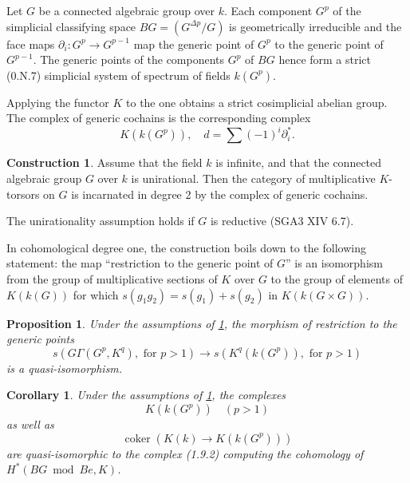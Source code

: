 \documentclass[11pt,a4paper]{article}
\theoremstyle{plain}
\newtheorem{proposition}[theorem]{Proposition}
\newtheorem{corollary}[theorem]{Corollary}
\theoremstyle{definition}
\newtheorem{construction}[theorem]{Construction}
\DeclareMathOperator{\coker}{coker}
\begin{document}
Let $G$ be a connected algebraic group over $k$. Each component $G^p$ of the simplicial classifying space $BG = (G^{\Delta p}/G)$ is geometrically irreducible and the face maps $\partial_i: G^p \to G^{p-1}$ map the generic point of $G^p$ to the generic point of $G^{p-1}$. The generic points of the components $G^p$ of $BG$ hence form a strict (0.N.7) simplicial system of spectrum of fields $k(G^p)$.

Applying the functor $K$ to the one obtains a strict cosimplicial abelian group. The complex of generic cochains is the corresponding complex
\[K(k(G^p)), \quad d = \sum (-1)^i \partial_i^*.\]

\begin{construction}\label{constr:8.2}
Assume that the field $k$ is infinite, and that the connected algebraic group $G$ over $k$ is unirational. Then the category of multiplicative $K$-torsors on $G$ is incarnated in degree 2 by the complex of generic cochains.

The unirationality assumption holds if $G$ is reductive (SGA3 XIV 6.7).
\end{construction}

In cohomological degree one, the construction boils down to the following statement: the map ``restriction to the generic point of $G$'' is an isomorphism from the group of multiplicative sections of $K$ over $G$ to the group of elements of $K(k(G))$ for which $s(g_1 g_2) = s(g_1) + s(g_2)$ in $K(k(G \times G))$.

\begin{proposition}\label{prop:8.3}
Under the assumptions of \ref{constr:8.2}, the morphism of restriction to the generic points
\begin{equation}\label{eq:8.3.1}
s(G\Gamma(G^p, K^q), \text{ for } p > 1) \to s(K^q(k(G^p)), \text{ for } p > 1)
\end{equation}
is a quasi-isomorphism.
\end{proposition}

\begin{corollary}\label{cor:8.8}
Under the assumptions of \ref{constr:8.2}, the complexes
\begin{equation}\label{eq:8.8.1}
K(k(G^p)) \quad (p > 1)
\end{equation}
as well as
\begin{equation}\label{eq:8.8.2}
\coker(K(k) \to K(k(G^p)))
\end{equation}
are quasi-isomorphic to the complex \textup{(1.9.2)} computing the cohomology of $H^*(BG \bmod Be, K)$.
\end{corollary}
\end{document}
